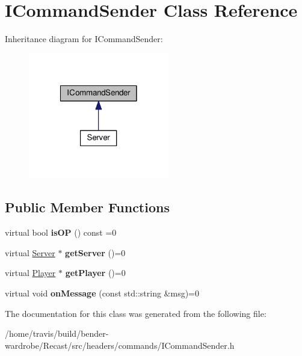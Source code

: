 \hypertarget{class_i_command_sender}{\section{I\-Command\-Sender Class Reference}
\label{class_i_command_sender}
}


Inheritance diagram for I\-Command\-Sender\-:
\nopagebreak
\begin{figure}[H]
\begin{center}
\leavevmode
\includegraphics[width=174pt]{class_i_command_sender__inherit__graph}
\end{center}
\end{figure}
\subsection*{Public Member Functions}
\begin{DoxyCompactItemize}
\item 
\hypertarget{class_i_command_sender_afe930466c485c8d9a67f624dc1dcac5e}{virtual bool {\bfseries is\-O\-P} () const =0}\label{class_i_command_sender_afe930466c485c8d9a67f624dc1dcac5e}

\item 
\hypertarget{class_i_command_sender_afe665fdd44daefad719049b540fc14b9}{virtual \hyperlink{class_server}{Server} $\ast$ {\bfseries get\-Server} ()=0}\label{class_i_command_sender_afe665fdd44daefad719049b540fc14b9}

\item 
\hypertarget{class_i_command_sender_abe8ec89d12e5de40cec1062da47f336c}{virtual \hyperlink{class_player}{Player} $\ast$ {\bfseries get\-Player} ()=0}\label{class_i_command_sender_abe8ec89d12e5de40cec1062da47f336c}

\item 
\hypertarget{class_i_command_sender_a613b27b190c7fb5123597939c0896080}{virtual void {\bfseries on\-Message} (const std\-::string \&msg)=0}\label{class_i_command_sender_a613b27b190c7fb5123597939c0896080}

\end{DoxyCompactItemize}


The documentation for this class was generated from the following file\-:\begin{DoxyCompactItemize}
\item 
/home/travis/build/bender-\/wardrobe/\-Recast/src/headers/commands/I\-Command\-Sender.\-h\end{DoxyCompactItemize}
